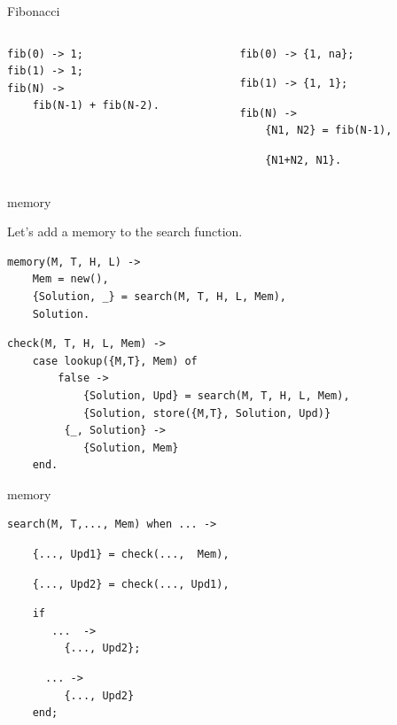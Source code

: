 \begin{frame}[fragile]{Fibonacci}

\begin{columns}
 \begin{column}{0.5\linewidth}
\begin{verbatim}
fib(0) -> 1;
fib(1) -> 1;
fib(N) -> 
    fib(N-1) + fib(N-2).
\end{verbatim}
 \end {column}
\pause
 \begin{column}{0.5\linewidth}
\begin{verbatim}
fib(0) -> {1, na};
\end{verbatim}
\pause
\begin{verbatim}
fib(1) -> {1, 1};
\end{verbatim}
\pause
\begin{verbatim}
fib(N) -> 
    {N1, N2} = fib(N-1),
\end{verbatim}
\pause
\begin{verbatim}
    {N1+N2, N1}.
\end{verbatim}
 \end {column}
\end{columns}

\end{frame}

\begin{frame}[fragile]{memory}

Let's add a memory to the search function. 

\begin{verbatim}
memory(M, T, H, L) ->
    Mem = new(),
    {Solution, _} = search(M, T, H, L, Mem),
    Solution.
\end{verbatim}

\begin{verbatim}
check(M, T, H, L, Mem) ->
    case lookup({M,T}, Mem) of
        false ->
            {Solution, Upd} = search(M, T, H, L, Mem),
            {Solution, store({M,T}, Solution, Upd)}
         {_, Solution} -> 
            {Solution, Mem}
    end.
\end{verbatim}

\end{frame}


\begin{frame}[fragile]{memory}

\begin{verbatim}
search(M, T,..., Mem) when ... ->
\end{verbatim}
\pause
\begin{verbatim}
    {..., Upd1} = check(...,  Mem), 
\end{verbatim}
\pause
\begin{verbatim}
    {..., Upd2} = check(..., Upd1), 
\end{verbatim}
\pause
\begin{verbatim}
    if 
       ...  ->
         {..., Upd2};
\end{verbatim}
\pause
\begin{verbatim}
      ... ->
         {..., Upd2}
    end;
\end{verbatim}

\end{frame}

